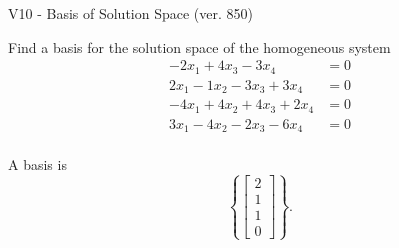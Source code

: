 \begin{exercise}
  \begin{exerciseTitle}V10 - Basis of Solution Space (ver. 850)\end{exerciseTitle}
  \begin{exerciseStatement}
    Find a basis for the solution space of the homogeneous system 
\begin{align*}
 -2 x_ 1 + 4 x_ 3 -3 x_ 4 &= 0  \\ 
  2 x_ 1 -1 x_ 2 -3 x_ 3 + 3 x_ 4 &= 0  \\ 
  -4 x_ 1 + 4 x_ 2 + 4 x_ 3 + 2 x_ 4 &= 0  \\ 
  3 x_ 1 -4 x_ 2 -2 x_ 3 -6 x_ 4 &= 0  \\ 
 \end{align*}


 
  \end{exerciseStatement}

  \begin{exerciseAnswer}
   A basis is   
\[\left\{\left[\begin{array}{c}
2 \\
1 \\
1 \\
0
\end{array}\right]\right\}.\]

  


  \end{exerciseAnswer}
\end{exercise}